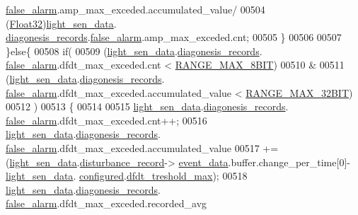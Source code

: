 \begin{DoxyCode}
      \hyperlink{a00017_a799f50625c0c03f9404a59287810113d}{false\_alarm}.amp\_max\_exceded.accumulated\_value/
00504                              (\hyperlink{a00072_a87d38f886e617ced2698fc55afa07637}{Float32})\hyperlink{a00047_a53c98c9f84d5cecf0747bbe1f6b83696}{light\_sen\_data}.
      \hyperlink{a00024_a7ae905b560513ad201e58c2f63375030}{diagonesis\_records}.\hyperlink{a00017_a799f50625c0c03f9404a59287810113d}{false\_alarm}.amp\_max\_exceded.cnt;
00505               \}
00506 
00507              \}\textcolor{keywordflow}{else}\{
00508              \textcolor{keywordflow}{if}(
00509                 (\hyperlink{a00047_a53c98c9f84d5cecf0747bbe1f6b83696}{light\_sen\_data}.\hyperlink{a00024_a7ae905b560513ad201e58c2f63375030}{diagonesis\_records}.
      \hyperlink{a00017_a799f50625c0c03f9404a59287810113d}{false\_alarm}.dfdt\_max\_exceded.cnt < \hyperlink{a00021_ae0c75a1cb44e5d3f00ec7c9e40acfda8}{RANGE\_MAX\_8BIT})
00510                 &
00511                 (\hyperlink{a00047_a53c98c9f84d5cecf0747bbe1f6b83696}{light\_sen\_data}.\hyperlink{a00024_a7ae905b560513ad201e58c2f63375030}{diagonesis\_records}.
      \hyperlink{a00017_a799f50625c0c03f9404a59287810113d}{false\_alarm}.dfdt\_max\_exceded.accumulated\_value < \hyperlink{a00021_a334bd006b6d2b397dbfc620d62c3c35c}{RANGE\_MAX\_32BIT})
00512                )
00513              \{
00514 
00515                  \hyperlink{a00047_a53c98c9f84d5cecf0747bbe1f6b83696}{light\_sen\_data}.\hyperlink{a00024_a7ae905b560513ad201e58c2f63375030}{diagonesis\_records}.
      \hyperlink{a00017_a799f50625c0c03f9404a59287810113d}{false\_alarm}.dfdt\_max\_exceded.cnt++;
00516                  \hyperlink{a00047_a53c98c9f84d5cecf0747bbe1f6b83696}{light\_sen\_data}.\hyperlink{a00024_a7ae905b560513ad201e58c2f63375030}{diagonesis\_records}.
      \hyperlink{a00017_a799f50625c0c03f9404a59287810113d}{false\_alarm}.dfdt\_max\_exceded.accumulated\_value
00517                  +=(\hyperlink{a00047_a53c98c9f84d5cecf0747bbe1f6b83696}{light\_sen\_data}.\hyperlink{a00024_ac9b38e2c1d3f1013a88d33506c754152}{disturbance\_record}->
      \hyperlink{a00028_a8c0bda69e71ef674e60da47ad0be9ab0}{event\_data}.buffer.change\_per\_time[0]-\hyperlink{a00047_a53c98c9f84d5cecf0747bbe1f6b83696}{light\_sen\_data}.
      \hyperlink{a00024_a94b2d1f6ea4ab334c74d24984dd27843}{configured}.\hyperlink{a00021_adf9a37828e447378b1d533185213316d}{dfdt\_treshold\_max});
00518                  \hyperlink{a00047_a53c98c9f84d5cecf0747bbe1f6b83696}{light\_sen\_data}.\hyperlink{a00024_a7ae905b560513ad201e58c2f63375030}{diagonesis\_records}.
      \hyperlink{a00017_a799f50625c0c03f9404a59287810113d}{false\_alarm}.dfdt\_max\_exceded.recorded\_avg

\end{DoxyCode}
